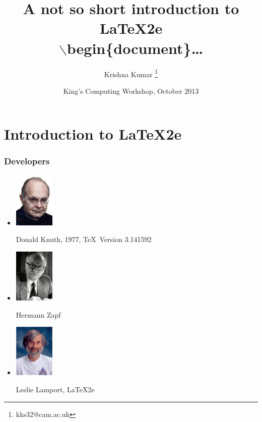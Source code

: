 \documentclass[10pt,xcolor=table]{beamer}
\title [\LaTeX for Beginners]
{A not so short introduction to \LaTeX2e \\ $\backslash$begin\{document\}\dots}
\author[Krishna Kumar] %
{Krishna Kumar \inst{*}\thanks{kks32@cam.ac.uk}\\ } %
\institute[ University of Cambridge ] %
{
  \inst{1}%
King's College\\ University of Cambridge}
\date[King's Computing Workshop 2013] %
{King's Computing Workshop, October 2013}
\begin{document}
\begin{frame}
  \titlepage
\end{frame}

\section{Introduction to \LaTeX2e}
\begin{frame}
\frametitle{Developers}
\begin{itemize}
\item
\parbox{0.25\textwidth}{\includegraphics[width=0.15\textwidth]{figs/Donald_Knuth.png}}\hspace{0cm}
\parbox{0.65\textwidth}{Donald Knuth, 1977, \TeX ~Version 3.141592}
\item
\parbox{0.25\textwidth}{\includegraphics[width=0.15\textwidth]{figs/Hermann.jpg}}\hspace{0cm}
\parbox{0.65\textwidth}{Hermann Zapf}
\item
\parbox{0.25\textwidth}{\includegraphics[width=0.15\textwidth]{figs/Leslie.png}}\hspace{0cm}
\parbox{0.65\textwidth}{Leslie Lamport, \LaTeX2e}
\end{itemize}
\end{frame}

\end{document}

